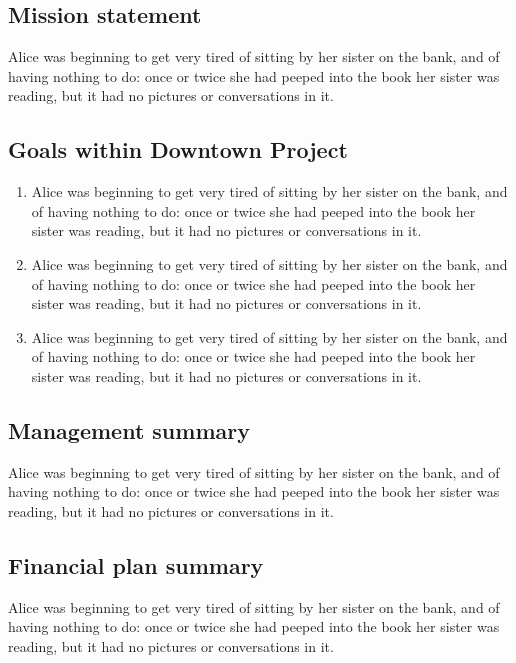 \documentclass[12pt]{article}
\begin{document}
\subsection{Mission statement}
\label{sec:orgheadline2}
Alice was beginning to get very tired of sitting by her sister on the bank, and of having nothing to do: once or twice she had peeped into the book her sister was reading, but it had no pictures or conversations in it. 

\subsection{Goals within Downtown Project}
\label{sec:orgheadline3}
\begin{enumerate}
\item Alice was beginning to get very tired of sitting by her sister on the bank, and of having nothing to do: once or twice she had peeped into the book her sister was reading, but it had no pictures or conversations in it.
\item Alice was beginning to get very tired of sitting by her sister on the bank, and of having nothing to do: once or twice she had peeped into the book her sister was reading, but it had no pictures or conversations in it.
\item Alice was beginning to get very tired of sitting by her sister on the bank, and of having nothing to do: once or twice she had peeped into the book her sister was reading, but it had no pictures or conversations in it.
\end{enumerate}

\subsection{Management summary}
\label{sec:orgheadline4}
Alice was beginning to get very tired of sitting by her sister on the bank, and of having nothing to do: once or twice she had peeped into the book her sister was reading, but it had no pictures or conversations in it. 

\subsection{Financial plan summary}
\label{sec:orgheadline5}
Alice was beginning to get very tired of sitting by her sister on the bank, and of having nothing to do: once or twice she had peeped into the book her sister was reading, but it had no pictures or conversations in it. 
\end{document}

